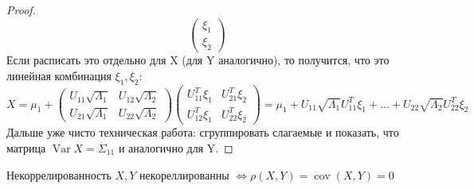 \documentclass{article}
\DeclareMathOperator{\Var}{Var}
\DeclareMathOperator{\cov}{cov}
\begin{document}
\begin{claim}
\begin{proof}
$$\begin{pmatrix}
            \xi_1 \\ \xi_2
        \end{pmatrix}
        $$
        Если расписать это отдельно для X (для Y аналогично), то получится, что это линейная комбинация $\xi_1, \xi_2$:
        $$ X = \mu_1 +  \begin{pmatrix}
        U_{11} \sqrt{\Lambda_{1}} & U_{12}  \sqrt{\Lambda_{2}}\\
        U_{21}  \sqrt{\Lambda_{1}} & U_{22}  \sqrt{\Lambda_{2}}
        \end{pmatrix}
        \begin{pmatrix}
         U_{11}^T \xi_1 & U_{21}^T\xi_2 \\
        U_{12}^T \xi_1& U_{22}^T \xi_2
        \end{pmatrix} = \mu_1 + U_{11}\sqrt{\Lambda_{1}}U_{11}^T \xi_1 + \dots + U_{22}  \sqrt{\Lambda_{2}} U_{22}^T \xi_2$$
        Дальше уже чисто техническая работа: сгруппировать слагаемые и показать, что матрица $\Var X = \Sigma_{11}$ и аналогично для Y. 
        \end{proof}
    \end{claim}
    \begin{definition}{Некоррелированность}
        $X, Y$ некореллированны $\Leftrightarrow \rho(X, Y) = \cov(X, Y) = 0$
    \end{definition}
\end{document}
